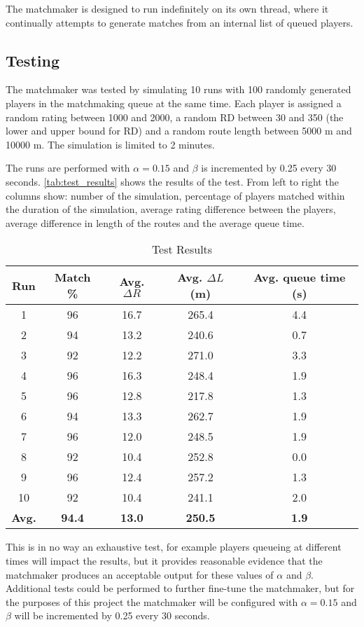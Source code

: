 The matchmaker is designed to run indefinitely on its own thread, where it continually attempts to generate matches from an internal list of queued players.

\subsection{Testing}
The matchmaker was tested by simulating 10 runs with 100 randomly generated players in the matchmaking queue at the same time.
Each player is assigned a random rating between 1000 and 2000, a random RD between 30 and 350 (the lower and upper bound for RD) and a random route length between 5000 m and 10000 m.
The simulation is limited to 2 minutes.

The runs are performed with $\alpha = 0.15$ and $\beta$ is incremented by 0.25 every 30 seconds.
\autoref{tab:test_results} shows the results of the test.
From left to right the columns show: number of the simulation, percentage of players matched within the duration of the simulation, average rating difference between the players, average difference in length of the routes and the average queue time.

\begin{table}[!ht]
	\centering
	\begin{tabular}{c | c c c c}
		\textbf{Run}	& \textbf{Match \%}		& \textbf{Avg. $\Delta R$}		& \textbf{Avg. $\Delta L$ (m)}		& \textbf{Avg. queue time (s)} \\
		\hline
		1				& 96					& 16.7							& 265.4								& 4.4 \\
		2				& 94					& 13.2							& 240.6								& 0.7 \\
		3				& 92					& 12.2							& 271.0								& 3.3 \\
		4				& 96					& 16.3							& 248.4								& 1.9 \\
		5				& 96					& 12.8							& 217.8								& 1.3 \\
		6				& 94					& 13.3							& 262.7								& 1.9 \\
		7				& 96					& 12.0							& 248.5								& 1.9 \\
		8				& 92					& 10.4							& 252.8								& 0.0 \\
		9				& 96					& 12.4							& 257.2								& 1.3 \\
		10				& 92					& 10.4							& 241.1								& 2.0 \\
		\hline\hline
		\textbf{Avg.}	& \textbf{94.4}			& \textbf{13.0}					& \textbf{250.5}					& \textbf{1.9}
	\end{tabular}
	\caption{Test Results}
	\label{tab:test_results}
\end{table}

This is in no way an exhaustive test, for example players queueing at different times will impact the results, but it provides reasonable evidence that the matchmaker produces an acceptable output for these values of $\alpha$ and $\beta$.
Additional tests could be performed to further fine-tune the matchmaker, but for the purposes of this project the matchmaker will be configured with $\alpha = 0.15$ and $\beta$ will be incremented by 0.25 every 30 seconds.

